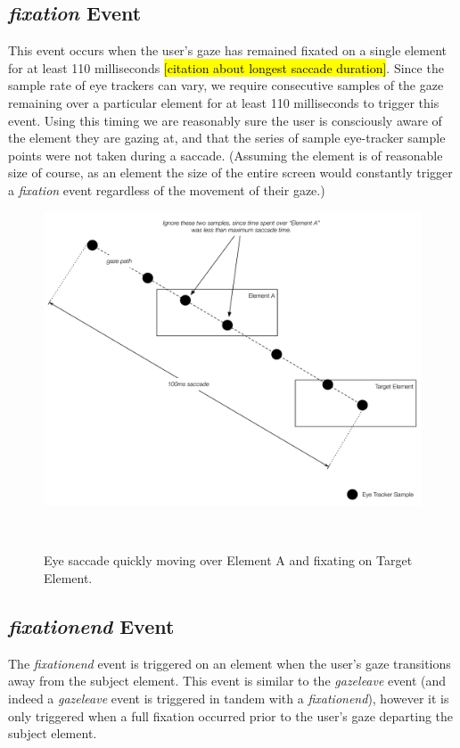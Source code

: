 \documentclass{sigchi}
\begin{document}
\subsection{\textbf{\textit{fixation}} Event}
This event occurs when the user's gaze has remained fixated on a single element for at least 110 milliseconds \hl{[citation about longest saccade duration]}. Since the sample rate of eye trackers can vary, we require consecutive samples of the gaze remaining over a particular element for at least 110 milliseconds to trigger this event. Using this timing we are reasonably sure the user is consciously aware of the element they are gazing at, and that the series of sample eye-tracker sample points were not taken during a saccade. (Assuming the element is of reasonable size of course, as an element the size of the entire screen would constantly trigger a \textit{fixation} event regardless of the movement of their gaze.)

\begin{figure}
\centering
  \includegraphics[width=0.9\columnwidth]{figures/saccade.pdf}
  \caption{Eye saccade quickly moving over Element A and fixating on Target Element.}~\label{fig:saccade}
\end{figure}

\subsection{\textbf{\textit{fixationend}} Event}
The \textit{fixationend} event is triggered on an element when the user's gaze transitions away from the subject element. This event is similar to the \textit{gazeleave} event (and indeed a \textit{gazeleave} event is triggered in tandem with a \textit{fixationend}), however it is only triggered when a full fixation occurred prior to the user's gaze departing the subject element.
\end{document}
